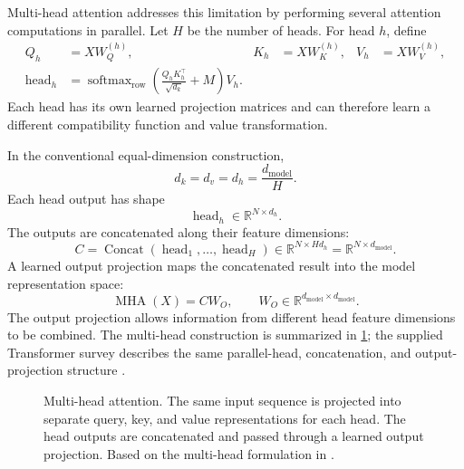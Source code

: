 Multi-head attention addresses this limitation by performing several
attention computations in parallel. Let \(H\) be the number of heads. For
head \(h\), define
\begin{align}
    Q_h&=XW_Q^{(h)},&
    K_h&=XW_K^{(h)},&
    V_h&=XW_V^{(h)},
    \label{eq:attn-head-qkv}\\
    \operatorname{head}_h
    &=
    \operatorname{softmax}_{\mathrm{row}}
    \left(
        \frac{Q_hK_h^\top}{\sqrt{d_k}}+M
    \right)V_h.
    \label{eq:attn-head-output}
\end{align}
Each head has its own learned projection matrices and can therefore learn
a different compatibility function and value transformation.

In the conventional equal-dimension construction,
\begin{equation}
    d_k=d_v=d_h=\frac{d_{\mathrm{model}}}{H}.
    \label{eq:attn-head-dimension}
\end{equation}
Each head output has shape
\begin{equation}
    \operatorname{head}_h
    \in\mathbb{R}^{N\times d_h}.
    \label{eq:attn-head-output-shape}
\end{equation}
The outputs are concatenated along their feature dimensions:
\begin{equation}
    C=
    \operatorname{Concat}
    \left(
        \operatorname{head}_1,\ldots,\operatorname{head}_H
    \right)
    \in
    \mathbb{R}^{N\times Hd_h}
    =
    \mathbb{R}^{N\times d_{\mathrm{model}}}.
    \label{eq:attn-head-concatenation}
\end{equation}
A learned output projection maps the concatenated result into the model
representation space:
\begin{equation}
    \boxed{
    \operatorname{MHA}(X)=CW_O,
    \qquad
    W_O\in
    \mathbb{R}^{d_{\mathrm{model}}\times d_{\mathrm{model}}}.
    }
    \label{eq:attn-mha-output}
\end{equation}
The output projection allows information from different head feature
dimensions to be combined. The multi-head construction is summarized in
\cref{fig:attn-multi-head}; the supplied Transformer survey describes the
same parallel-head, concatenation, and output-projection structure
\parencite{ansar2024transformers}.

\begin{figure}[htbp]
    \centering
    
    \caption{Multi-head attention. The same input sequence is projected into
    separate query, key, and value representations for each head. The head
    outputs are concatenated and passed through a learned output projection.
    Based on the multi-head formulation in
    \textcite{ansar2024transformers}.}
    \label{fig:attn-multi-head}
\end{figure}

